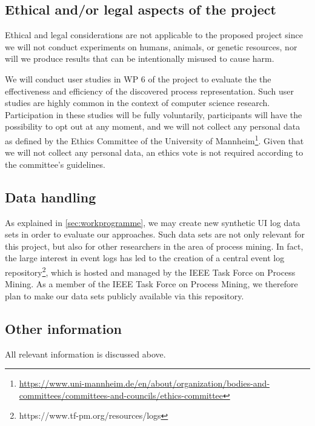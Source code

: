 
 \subsection{Ethical and/or legal aspects of the project}
 \label{sec:ethical}
 
Ethical and legal considerations are not applicable to the proposed project since we 
will not conduct experiments on humans, animals, or genetic resources, nor will we  produce results that can be intentionally misused to cause harm. 

We will conduct user studies in WP 6 of the project to evaluate the the effectiveness and efficiency of the discovered process representation. Such user studies are highly common in the context of computer science research. Participation in these studies will be fully voluntarily, participants will have the possibility to opt out at any moment, and we will not collect any personal data as defined by the Ethics Committee of the University of Mannheim\footnote{\url{https://www.uni-mannheim.de/en/about/organization/bodies-and-committees/committees-and-councils/ethics-committee}}. Given that we will not collect any personal data, an ethics vote is not required according to the committee's guidelines. 

\subsection{Data handling}

As explained in \autoref{sec:workprogramme}, we may create new synthetic UI log data sets in order to evaluate our approaches. Such data sets are not only relevant for this project, but also for other researchers in the area of process mining. In fact, the large interest in event logs has led to the creation of a central event log repository\footnote{https://www.tf-pm.org/resources/logs}, which is hosted and managed by the IEEE Task Force on Process Mining. As a member of the IEEE Task Force on Process Mining, we therefore plan to make our data sets publicly available via this repository.


\subsection{Other information}

All relevant information is discussed above. 